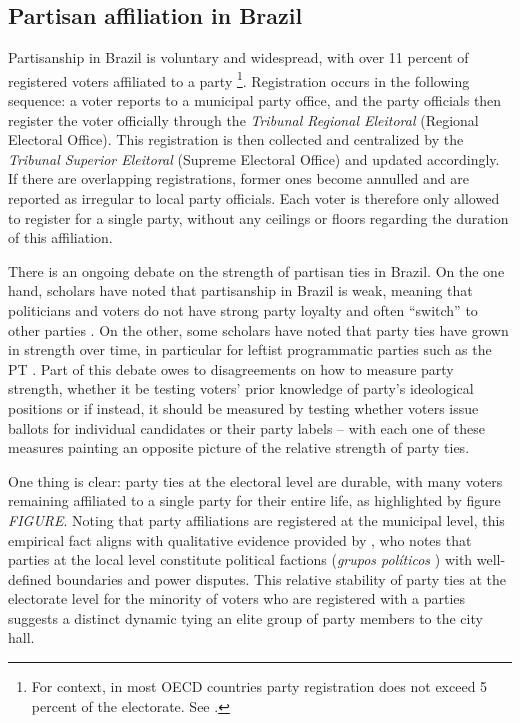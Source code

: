 \documentclass[12pt,a4paper]{article}
\begin{document}
\subsection{Partisan affiliation in Brazil}

Partisanship in Brazil is voluntary and widespread, with over 11 percent of registered voters affiliated to a party \citep{speck2015estudo}\footnote{For context, in most OECD countries party registration does not exceed 5 percent of the electorate. See \citet{biezen2014decline}.}. Registration occurs in the following sequence: a voter reports to a municipal party office, and the party officials then register the voter officially through the \emph{Tribunal Regional Eleitoral} (Regional Electoral Office). This registration is then collected and centralized by the \emph{Tribunal Superior Eleitoral} (Supreme Electoral Office) and updated accordingly. If there are overlapping registrations, former ones become annulled and are reported as irregular to local party officials. Each voter is therefore only allowed to register for a single party, without any ceilings or floors regarding the duration of this affiliation.

There is an ongoing debate on the strength of partisan ties in Brazil. On the one hand, scholars have noted that partisanship in Brazil is weak, meaning that politicians and voters do not have strong party loyalty and often ``switch'' to other parties \citep{desposato2006parties,ames2002deadlock}. On the other, some scholars have noted that party ties have grown in strength over time, in particular for leftist programmatic parties such as the PT \citep{samuels2014power,samuels2006sources}. Part of this debate owes to disagreements on how to measure party strength, whether it be testing voters' prior knowledge of party's ideological positions or if instead, it should be measured by testing whether voters issue ballots for individual candidates or their party labels -- with each one of these measures painting an opposite picture of the relative strength of party ties.

One thing is clear: party ties at the electoral level are durable, with many voters remaining affiliated to a single party for their entire life, as highlighted by figure \emph{FIGURE}. Noting that party affiliations are registered at the municipal level, this empirical fact aligns with qualitative evidence provided by \citet{palmeira1995comicios}, who notes that parties at the local level constitute political factions (\emph{grupos pol\'{i}ticos} ) with well-defined boundaries and power disputes. This relative stability of party ties at the electorate level for the minority of voters who are registered with a parties suggests a distinct dynamic tying an elite group of party members to the city hall.
\end{document}
